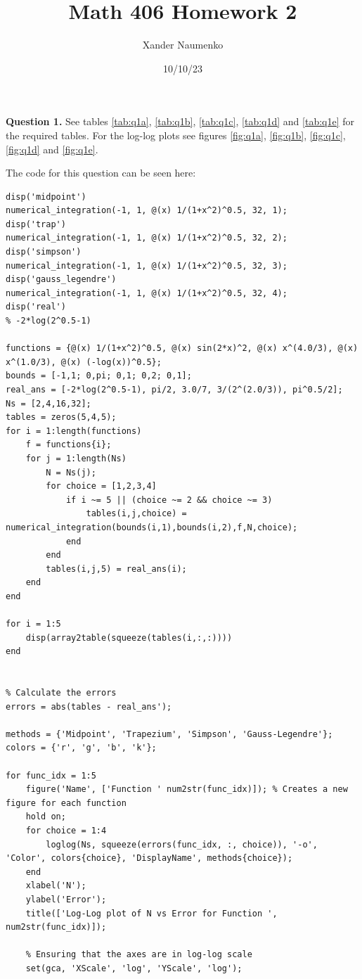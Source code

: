 \documentclass[letterpaper, reqno,11pt]{article}
\begin{document}
\title{Math 406 Homework 2}
\date{10/10/23}
\author{Xander Naumenko}
\maketitle

{\medskip\noindent\bf Question 1.} See tables \ref{tab:q1a}, \ref{tab:q1b}, \ref{tab:q1c}, \ref{tab:q1d} and \ref{tab:q1e} for the required tables. For the log-log plots see figures \ref{fig:q1a}, \ref{fig:q1b}, \ref{fig:q1c}, \ref{fig:q1d} and \ref{fig:q1e}.

The code for this question can be seen here:
\begin{lstlisting}
disp('midpoint')
numerical_integration(-1, 1, @(x) 1/(1+x^2)^0.5, 32, 1);
disp('trap')
numerical_integration(-1, 1, @(x) 1/(1+x^2)^0.5, 32, 2);
disp('simpson')
numerical_integration(-1, 1, @(x) 1/(1+x^2)^0.5, 32, 3);
disp('gauss_legendre')
numerical_integration(-1, 1, @(x) 1/(1+x^2)^0.5, 32, 4);
disp('real')
% -2*log(2^0.5-1)

functions = {@(x) 1/(1+x^2)^0.5, @(x) sin(2*x)^2, @(x) x^(4.0/3), @(x) x^(1.0/3), @(x) (-log(x))^0.5};
bounds = [-1,1; 0,pi; 0,1; 0,2; 0,1];
real_ans = [-2*log(2^0.5-1), pi/2, 3.0/7, 3/(2^(2.0/3)), pi^0.5/2];
Ns = [2,4,16,32];
tables = zeros(5,4,5);
for i = 1:length(functions)
    f = functions{i};
    for j = 1:length(Ns)
        N = Ns(j);
        for choice = [1,2,3,4]
            if i ~= 5 || (choice ~= 2 && choice ~= 3)
                tables(i,j,choice) = numerical_integration(bounds(i,1),bounds(i,2),f,N,choice);
            end
        end
        tables(i,j,5) = real_ans(i);
    end
end

for i = 1:5
    disp(array2table(squeeze(tables(i,:,:))))
end


% Calculate the errors
errors = abs(tables - real_ans');

methods = {'Midpoint', 'Trapezium', 'Simpson', 'Gauss-Legendre'};
colors = {'r', 'g', 'b', 'k'};

for func_idx = 1:5
    figure('Name', ['Function ' num2str(func_idx)]); % Creates a new figure for each function
    hold on;
    for choice = 1:4
        loglog(Ns, squeeze(errors(func_idx, :, choice)), '-o', 'Color', colors{choice}, 'DisplayName', methods{choice});
    end
    xlabel('N');
    ylabel('Error');
    title(['Log-Log plot of N vs Error for Function ', num2str(func_idx)]);
    
    % Ensuring that the axes are in log-log scale
    set(gca, 'XScale', 'log', 'YScale', 'log');
    

\end{lstlisting}
\end{document}
